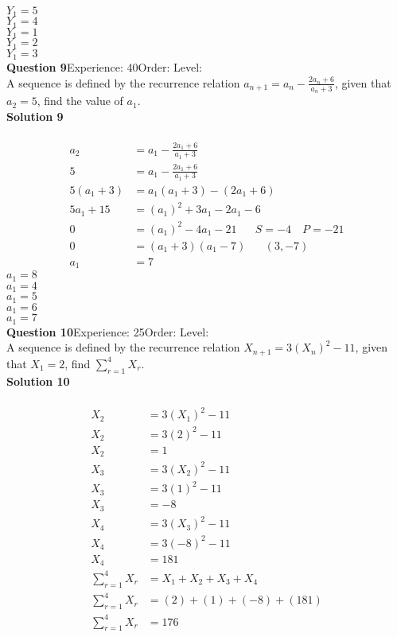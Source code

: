 \documentclass{article}
\begin{document}
$Y_1=5$\\
$Y_1=4$\\
$Y_1=1$\\
$Y_1=2$\\
$Y_1=3$\\
\noindent\textbf{Question 9}\hspace{20pt}Experience: 40\hspace{20pt}Order: \hspace{20pt}Level: \\[2pt]
A sequence is defined by the recurrence relation $a_{n+1}=a_n-\displaystyle\frac{2a_n+6}{a_n+3}$, given that  $a_2 =5$, find the value of $a_1$.\\[4pt]
\noindent\textbf{Solution 9}\\[2pt]
\\[-10pt]\begin{align*}
a_2&=a_1-\displaystyle\frac{2a_1+6}{a_1+3}\\[2pt]
5&=a_1-\displaystyle\frac{2a_1+6}{a_1+3}\\[2pt]
5(a_1+3)&=a_1(a_1+3)-(2a_1+6)\\[2pt]
5a_1+15&=(a_1)^2+3a_1-2a_1-6\\[2pt]
0&=(a_1)^2-4a_1-21\hspace{20pt}S=-4 \quad P=-21\\[2pt]
0&=(a_1+3)(a_1-7)\hspace{20pt}(3,-7)\\[2pt]
a_1&=7
\end{align*}
$a_1=8$\\
$a_1=4$\\
$a_1=5$\\
$a_1=6$\\
$a_1=7$\\
\noindent\textbf{Question 10}\hspace{20pt}Experience: 25\hspace{20pt}Order: \hspace{20pt}Level: \\[2pt]
A sequence is defined by the recurrence relation $X_{n+1}=3(X_n)^2-11$, given that  $X_1 =2$, find $\displaystyle\sum_{r=1}^{4} X_r$.\\[4pt]
\noindent\textbf{Solution 10}\\[2pt]
\\[-10pt]\begin{align*}
X_2&=3(X_1)^2-11\\[2pt]
X_2&=3(2)^2-11\\[2pt]
X_2&=1\\[12pt]
X_3&=3(X_2)^2-11\\[2pt]
X_3&=3(1)^2-11\\[2pt]
X_3&=-8\\[12pt]
X_4&=3(X_3)^2-11\\[2pt]
X_4&=3(-8)^2-11\\[2pt]
X_4&=181\\[12pt]
\displaystyle\sum_{r=1}^{4} X_r&=X_1+X_2+X_3+X_4\\[2pt]
\displaystyle\sum_{r=1}^{4} X_r&=(2)+(1)+(-8)+(181)\\[2pt]
\displaystyle\sum_{r=1}^{4} X_r&=176
\end{align*}
\end{document}
